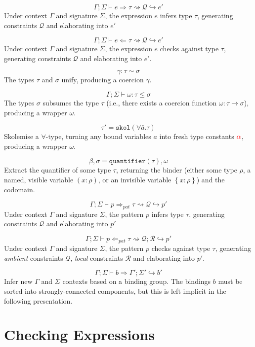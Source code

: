\documentclass[11pt]{article}
\newcommand{\checks}{\Leftarrow}
\newcommand{\infers}{\Rightarrow}
\newcommand{\cons}{\rightsquigarrow}
\newcommand{\reduces}{\hookrightarrow}
\newcommand{\skol}[1]{\mathtt{skol}(#1)}
\newcommand{\quant}[1]{\mathtt{quantifier}\left(#1\right)}
\newcommand{\skv}[1]{{\color{red} \mathbf{#1}}}
\newcommand{\Ambient}{\Gamma; \Sigma \vdash}
\begin{document}
$$\Ambient e \infers \tau \cons \mathscr{Q} \reduces e'$$
Under context $\Gamma$ and signature $\Sigma$, the expression $e$ infers type
$\tau$, generating constraints $\mathscr{Q}$ and elaborating into $e'$

$$\Ambient e \checks \tau \cons \mathscr{Q} \reduces e'$$
Under context $\Gamma$ and signature $\Sigma$, the expression $e$ checks
against type $\tau$, generating constraints $\mathscr{Q}$ and elaborating into
  $e'$.

$$\gamma: \tau \sim \sigma$$
The types $\tau$ and $\sigma$ unify, producing a coercion $\gamma$.

$$\Ambient \omega: \tau \le \sigma$$
The types $\sigma$ subsumes the type $\tau$ (i.e., there exists a coercion
function $\omega : \tau \to \sigma$), producing a wrapper $\omega$.

$$\tau' = \skol{\forall{\bar{a}}. \tau}$$
Skolemise a $\forall$-type, turning any bound variables $a$ into fresh
type constants $\skv{\alpha}$, producing a wrapper $\omega$.

$$\beta, \sigma = \quant{\tau}, \omega$$
Extract the quantifier of some type $\tau$, returning the binder (either some
type $\rho$, a named, visible variable $\left(x:\rho\right)$, or an invisible
variable $\left\{x:\rho\right\}$) and the codomain.

$$\Ambient p \infers_{pat} \tau \cons \mathscr{Q} \reduces p'$$
Under context $\Gamma$ and signature $\Sigma$, the pattern $p$ infers type
$\tau$, generating constraints $\mathscr{Q}$ and elaborating into $p'$

$$\Ambient p \checks_{pat} \tau \cons \mathscr{Q}; \mathscr{R} \reduces p'$$
Under context $\Gamma$ and signature $\Sigma$, the pattern $p$ checks against
type $\tau$, generating \textit{ambient} constraints $\mathscr{Q}$,
\textit{local} constraints $\mathscr{R}$ and elaborating into $p'$.

$$\Ambient b \infers \Gamma'; \Sigma' \reduces b'$$
Infer new $\Gamma$ and $\Sigma$ contexts based on a binding group. The bindings
$b$ must be sorted into strongly-connected components, but this is left
implicit in the following presentation.

\section{Checking Expressions}
\end{document}
